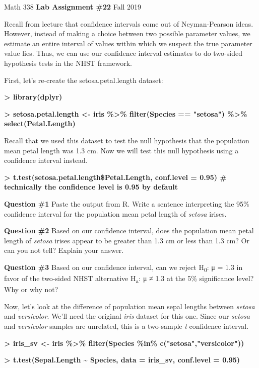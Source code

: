 Math 338 \textbf{Lab Assignment \#22} Fall 2019

Recall from lecture that confidence intervals come out of Neyman-Pearson
ideas. However, instead of making a choice between {two} possible
parameter values, we estimate an entire {interval} of values within
which we suspect the true parameter value lies. Thus, we can use our
confidence interval estimates to do two-sided hypothesis tests in the
NHST framework.

First, let's re-create the setosa.petal.length dataset:

\textbf{\textgreater{} library(dplyr)}

\textbf{\textgreater{} setosa.petal.length \textless- iris
\%\textgreater\% filter(Species == "setosa") \%\textgreater\%
select(Petal.Length)}

Recall that we used this dataset to test the null hypothesis that the
population mean petal length was 1.3 cm. Now we will test this null
hypothesis using a confidence interval instead.

\textbf{\textgreater{} t.test(setosa.petal.length\$Petal.Length,
conf.level = 0.95) \# technically the confidence level is 0.95 by
default}

\textbf{Question \#1} Paste the output from R. Write a sentence
interpreting the 95\% confidence interval for the population mean petal
length of \emph{setosa} irises.

\textbf{Question \#2} Based on our confidence interval, does the
population mean petal length of \emph{setosa} irises appear to be
greater than 1.3 cm or less than 1.3 cm? Or can you not tell? Explain
your answer.

\textbf{Question \#3} Based on our confidence interval, can we reject
H\textsubscript{0}: μ = 1.3 in favor of the two-sided NHST alternative
H\textsubscript{a}: μ ≠ 1.3 at the 5\% significance level? Why or why
not?

Now, let's look at the difference of population mean sepal lengths
between \emph{setosa} and \emph{versicolor}. We'll need the original
\emph{iris} dataset for this one. Since our \emph{setosa} and
\emph{versicolor} samples are unrelated, this is a two-sample \emph{t}
confidence interval.

\textbf{\textgreater{} iris\_sv \textless- iris \%\textgreater\%
filter(Species \%in\% c("setosa","versicolor"))}

\textbf{\textgreater{} t.test(Sepal.Length \textasciitilde{} Species,
data = iris\_sv, conf.level = 0.95)}

